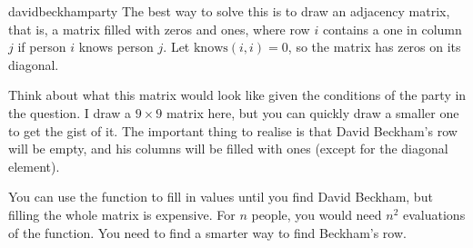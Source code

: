 \begin{answer}{davidbeckhamparty}
The best way to solve this is to draw an adjacency matrix,
that is, a matrix filled with zeros and ones, where
row $i$ contains a one in column $j$ if person $i$ knows person $j$.
Let $\text{knows}(i,i)=0$, so the matrix has zeros on its diagonal.

\begin{center}
\end{center}
Think about what this matrix would look like given the conditions of the party in the question.
I draw a $9 \times 9$ matrix here, but you can quickly draw a smaller one to get the gist of it.
The important thing to realise is that David Beckham’s row will be empty, and his columns will be filled with ones (except for the diagonal element).
\begin{center}
\end{center}
You can use the function to fill in values until you find David Beckham,
but filling the whole matrix is expensive. For $n$ people, you would need $n^2$ evaluations of the function.
You need to find a smarter way to find Beckham's row.


\end{answer}
